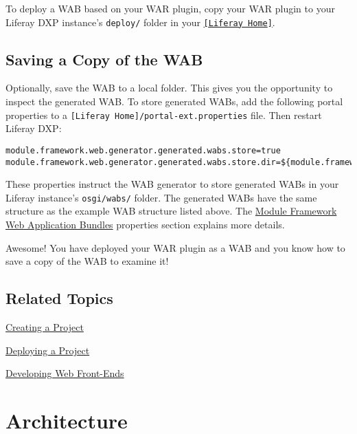 To deploy a WAB based on your WAR plugin, copy your WAR plugin to your
Liferay DXP instance's \texttt{deploy/} folder in your
\href{/docs/7-2/deploy/-/knowledge_base/d/liferay-home}{\texttt{{[}Liferay\ Home{]}}}.

\section{Saving a Copy of the WAB}\label{saving-a-copy-of-the-wab}

Optionally, save the WAB to a local folder. This gives you the
opportunity to inspect the generated WAB. To store generated WABs, add
the following portal properties to a
\texttt{{[}Liferay\ Home{]}/portal-ext.properties} file. Then restart
Liferay DXP:

\begin{verbatim}
module.framework.web.generator.generated.wabs.store=true
module.framework.web.generator.generated.wabs.store.dir=${module.framework.base.dir}/wabs
\end{verbatim}

These properties instruct the WAB generator to store generated WABs in
your Liferay instance's \texttt{osgi/wabs/} folder. The generated WABs
have the same structure as the example WAB structure listed above. The
\href{https://docs.liferay.com/dxp/portal/7.2-latest/propertiesdoc/portal.properties.html\#Module\%20Framework\%20Web\%20Application\%20Bundles}{Module
Framework Web Application Bundles} properties section explains more
details.

Awesome! You have deployed your WAR plugin as a WAB and you know how to
save a copy of the WAB to examine it!

\section{Related Topics}\label{related-topics-7}

\href{/docs/7-2/reference/-/knowledge_base/r/creating-a-project}{Creating
a Project}

\href{/docs/7-2/reference/-/knowledge_base/r/deploying-a-project}{Deploying
a Project}

\href{/docs/7-2/appdev/-/knowledge_base/a/web-front-ends}{Developing Web
Front-Ends}

\chapter{Architecture}\label{architecture}

